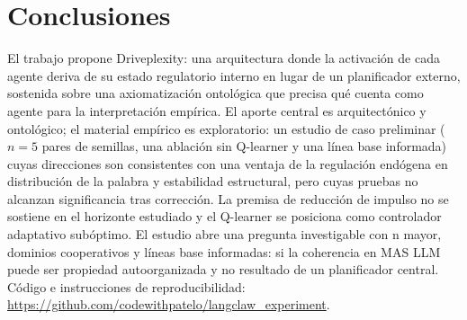\documentclass{llncs}
\begin{document}
\section{Conclusiones}
\label{sec:conclusion}

El trabajo propone Driveplexity: una arquitectura donde la activaci\'on
de cada agente deriva de su estado regulatorio interno en lugar de un
planificador externo, sostenida sobre una axiomatizaci\'on
ontol\'ogica que precisa qu\'e cuenta como agente para la
interpretaci\'on emp\'irica. El aporte central es arquitect\'onico y
ontol\'ogico; el material emp\'irico es exploratorio: un estudio de
caso preliminar ($n{=}5$ pares de semillas, una ablaci\'on sin
Q-learner y una l\'inea base informada) cuyas direcciones son
consistentes con una ventaja de la regulaci\'on end\'ogena en
distribuci\'on de la palabra y estabilidad estructural, pero cuyas
pruebas no alcanzan significancia tras correcci\'on. La premisa de
reducci\'on de impulso no se sostiene en el horizonte estudiado y el
Q-learner se posiciona como controlador adaptativo sub\'optimo. El
estudio abre una pregunta investigable con n mayor, dominios
cooperativos y l\'ineas base informadas: si la coherencia en MAS
LLM puede ser propiedad autoorganizada y no resultado de un
planificador central. C\'odigo e instrucciones de reproducibilidad:
\url{https://github.com/codewithpatelo/langclaw_experiment}.

\printbibliography
\end{document}
